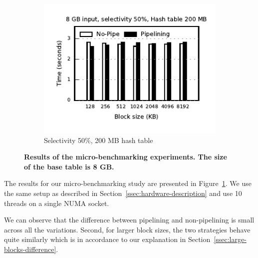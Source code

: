 \begin{figure}[t]
\begin{subfigure}[ht]{0.32\textwidth}
		\includegraphics[width=\textwidth]{pipeline/figures/microbenchmark-8gbinput-200mbht-selectivity50pc}	
		\caption{Selectivity 50\%, 200 MB hash table}
	\end{subfigure}
	\caption{\textbf{Results of the micro-benchmarking experiments. The size of the base table is 8 GB. }}
	\label{fig:microbenchmarking-results}
\end{figure}

The results for our micro-benchmarking study are presented in Figure~\ref{fig:microbenchmarking-results}. 
We use the same setup as described in Section~\ref{ssec:hardware-description} and use 10 threads on a single NUMA socket.

We can observe that the difference between pipelining and non-pipelining is small across all the variations.
Second, for larger block sizes, the two strategies behave quite similarly which is in accordance to our explanation in Section~\ref{ssec:large-blocks-difference}.